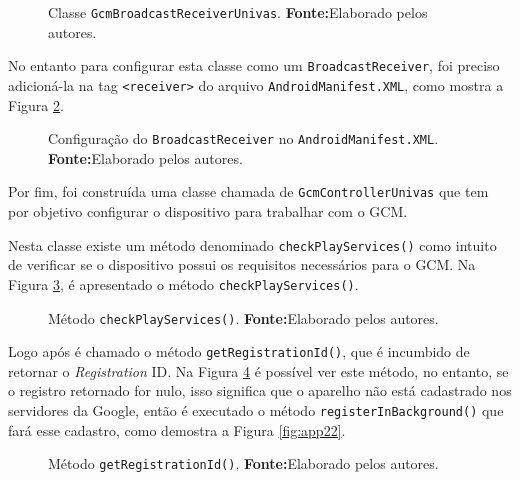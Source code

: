 	\begin{figure}[h!] 
		
		\caption[Classe GcmBroadcastReceiverUnivas]{Classe
		\texttt{GcmBroadcastReceiverUnivas}.
		\textbf{Fonte:}Elaborado pelos autores.}
		\label{fig:app18}
	\end{figure}
		
	\par No entanto para configurar esta classe como um \texttt{BroadcastReceiver},
foi preciso adicioná-la na tag \texttt{<receiver>} do arquivo
\texttt{AndroidManifest.XML}, como mostra a Figura \ref{fig:app19}.

	\begin{figure}[h!] 
		
		\caption[Configuração do BroadcastReceiver no
		AndroidManifest.XML]{Configuração do \texttt{BroadcastReceiver} no
		\texttt{AndroidManifest.XML}.
		\textbf{Fonte:}Elaborado pelos autores.}
		\label{fig:app19}
	\end{figure}

	\par Por fim, foi construída uma classe chamada de \texttt{GcmControllerUnivas}
que tem por objetivo configurar o dispositivo para trabalhar com o GCM.

	\par Nesta classe existe um método denominado \texttt{checkPlayServices()} como
intuito de verificar se o dispositivo possui os requisitos necessários para o
GCM. Na Figura \ref{fig:app20}, é apresentado o método
\texttt{checkPlayServices()}.

	\begin{figure}[h!] 
		
		\caption[Método checkPlayServices()]{Método \texttt{checkPlayServices()}.
		\textbf{Fonte:}Elaborado pelos autores.}
		\label{fig:app20}
	\end{figure}
	
	\pagebreak
	
	\par Logo após é chamado o método \texttt{getRegistrationId()}, que é incumbido
de retornar o \textit{Registration} ID. Na Figura \ref{fig:app21} é possível ver
este método, no entanto, se o registro retornado for nulo, isso significa que o
aparelho não está cadastrado nos servidores da Google, então é executado o
método \texttt{registerInBackground()} que fará esse cadastro, como demostra a
Figura \ref{fig:app22}.

	\begin{figure}[h!] 
		
		\caption[Método getRegistrationId()]{Método \texttt{getRegistrationId()}.
		\textbf{Fonte:}Elaborado pelos autores.}
		\label{fig:app21}
	\end{figure}
	
